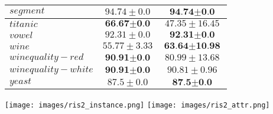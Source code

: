 \documentclass[a4paper, 12pt]{article}
\begin{document}
\begin{table}[h!]
\begin{center}
\begin{tabular}{l|c|c}
        \hline
        $segment$ & $94.74 \pm 0.0$  & $\textbf{94.74} \pm \textbf{0.0}$ \\
        \hline
        $titanic$ & $\textbf{66.67} \pm \textbf{0.0}$  & $47.35 \pm 16.45$ \\
        \hline
        $vowel$ & $92.31 \pm 0.0$  & $\textbf{92.31} \pm \textbf{0.0}$ \\
        \hline
        $wine$ & $55.77 \pm 3.33$  & $\textbf{63.64} \pm \textbf{10.98}$ \\
        \hline
        $winequality-red$ & $\textbf{90.91} \pm \textbf{0.0}$  & $80.99 \pm 13.68$ \\
        \hline
        $winequality-white$ & $\textbf{90.91} \pm \textbf{0.0}$  & $90.81 \pm 0.96$ \\
        \hline
        $yeast$ & $87.5 \pm 0.0$  & $\textbf{87.5} \pm \textbf{0.0}$ \\
    \end{tabular}
  \end{center}
\end{table}

\texttt{[image: images/ris2\_instance.png]}
\texttt{[image: images/ris2\_attr.png]}
\end{document}
